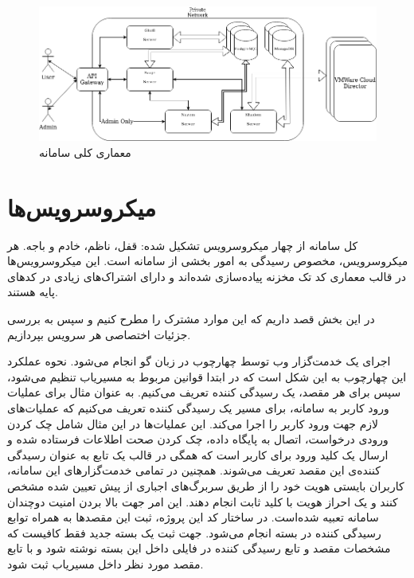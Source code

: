 \begin{figure}
	\centering
	\includegraphics[scale=0.5]{figures/30bird-arch.png}
	\caption{معماری کلی سامانه}
	\label{fig:30bird-arch}
\end{figure}


\clearpage
\section{میکروسرویس‌ها}
کل سامانه از چهار میکروسرویس تشکیل شده: قفل، ناظم، خادم و باجه. هر میکروسرویس، مخصوص رسیدگی به امور بخشی از سامانه است. این میکروسرویس‌ها در قالب معماری کد تک مخزنه پیاده‌سازی شده‌اند و دارای اشتراک‌های زیادی در کد‌های پایه هستند.

در این بخش قصد داریم که این موارد مشترک را مطرح کنیم و سپس به بررسی جزئیات اختصاصی هر سرویس بپردازیم.

اجرای یک خدمت‌گزار وب توسط چهارچوب  در زبان گو انجام می‌شود. نحوه عملکرد این چهارچوب به این شکل است که در ابتدا قوانین مربوط به مسیریاب تنظیم می‌شود، سپس برای هر مقصد، یک رسیدگی کننده تعریف می‌کنیم. به عنوان مثال برای عملیات ورود کاربر به سامانه، برای مسیر  یک رسیدگی کننده تعریف می‌کنیم که عملیات‌های لازم جهت ورود کاربر را اجرا می‌کند. این عملیات‌ها در این مثال شامل چک کردن ورودی درخواست، اتصال به پایگاه داده، چک کردن صحت اطلاعات فرستاده شده و ارسال یک کلید ورود برای کاربر است که همگی در قالب یک تابع به عنوان رسیدگی کننده‌ی این مقصد تعریف می‌شوند. همچنین در تمامی خدمت‌گزار‌های این سامانه، کاربران بایستی هویت خود را از طریق سربرگ‌های اجباری از پیش تعیین شده مشخص کنند و یک احراز هویت با کلید ثابت انجام دهند. این امر جهت بالا بردن امنیت دوچندان سامانه تعبیه شده‌است.
در ساختار کد این پروژه، ثبت این مقصدها به همراه توابع رسیدگی کننده در بسته  انجام می‌شود. جهت ثبت یک بسته جدید فقط کافیست که مشخصات مقصد و تابع رسیدگی کننده در فایلی داخل این بسته نوشته شود و با تابع  مقصد مورد نظر داخل مسیریاب  ثبت شود.

